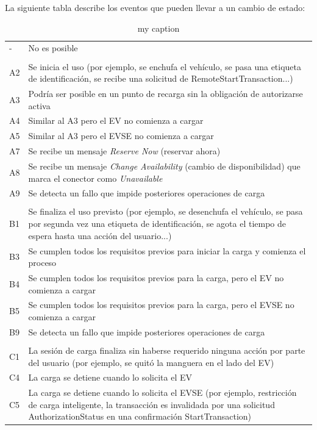 \documentclass[12pt,a4paper,onecolumn,oneside]{report}
\begin{document}
La siguiente tabla describe los eventos que pueden llevar a un cambio de estado:

\begin{longtable}{|p{1cm}|p{14cm}|}
\caption{my caption}
\label{variability_impl_mech}
\endfirsthead
\endhead
\hline
- & No es posible \\ 
 & \\
A2 & Se inicia el uso (por ejemplo, se enchufa el vehículo, se pasa una etiqueta de identificación, se recibe una solicitud de RemoteStartTransaction...) \\ 
A3 & Podría ser posible en un punto de recarga sin la obligación de autorizarse activa \\ 
A4 & Similar al A3 pero el EV no comienza a cargar \\ 
A5 & Similar al A3 pero el EVSE no comienza a cargar \\ 
A7 & Se recibe un mensaje \textit{Reserve Now} (reservar ahora) \\ 
A8 & Se recibe un mensaje \textit{Change Availability} (cambio de disponibilidad) que marca el conector como \textit{Unavailable} \\
A9 & Se detecta un fallo que impide posteriores operaciones de carga \\ 
 & \\
B1 & Se finaliza el uso previsto (por ejemplo, se desenchufa el vehículo, se pasa por segunda vez una etiqueta de identificación, se agota el tiempo de espera hasta una acción del usuario...) \\
B3 & Se cumplen todos los requisitos previos para iniciar la carga y comienza el proceso\\
B4 & Se cumplen todos los requisitos previos para la carga, pero el EV no comienza a cargar \\
B5 & Se cumplen todos los requisitos previos para la carga, pero el EVSE no comienza a cargar \\
B9 & Se detecta un fallo que impide posteriores operaciones de carga \\
 & \\
C1 & La sesión de carga finaliza sin haberse requerido ninguna acción por parte del usuario (por ejemplo, se quitó la manguera en el lado del EV)\\
C4 & La carga se detiene cuando lo solicita el EV\\
C5 & La carga se detiene cuando lo solicita el EVSE (por ejemplo, restricción de carga inteligente, la transacción es invalidada por una solicitud AuthorizationStatus en una confirmación StartTransaction)\\

\end{longtable}
\end{document}

